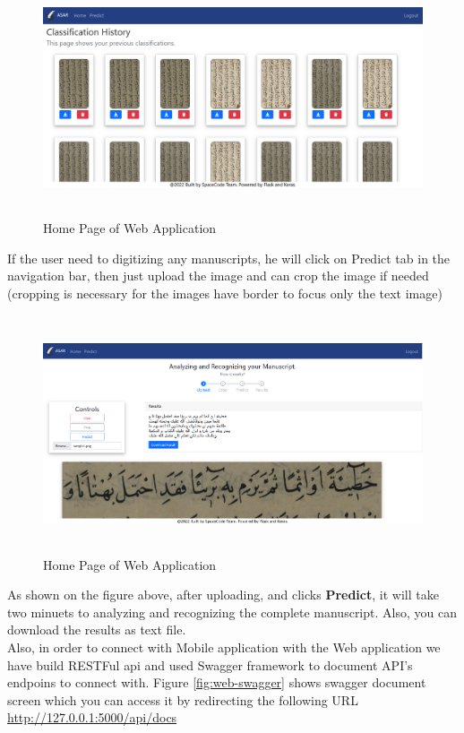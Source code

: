 \begin{figure}[!htb]
    \centering
    \includegraphics[width=15cm,height=7cm]{images/app/web/web-2.PNG}
    \caption{Home Page of Web Application}
    \label{fig:web-home-page}
\end{figure}

If the user need to digitizing any manuscripts, he will click on Predict tab in the navigation bar, then just upload the image and can crop the image if needed (cropping is necessary for the images have border to focus only the text image)

\begin{figure}[!htb]
    \centering
    \includegraphics[width=15cm,height=7cm]{images/app/web/web-3.PNG}
    \caption{Home Page of Web Application}
    \label{fig:web-home-page}
\end{figure}

As shown on the figure above, after uploading, and clicks \textbf{Predict}, it will take two minuets to analyzing and recognizing the complete manuscript. Also, you can download the results as text file. \\

Also, in order to connect with Mobile application with the Web application we have build RESTFul \acrshort{api} and used Swagger framework to document API's endpoins to connect with. Figure \ref{fig:web-swagger} shows swagger document screen which you can access it by redirecting the following URL \href{http://127.0.0.1:5000/api/docs}{http://127.0.0.1:5000/api/docs}

